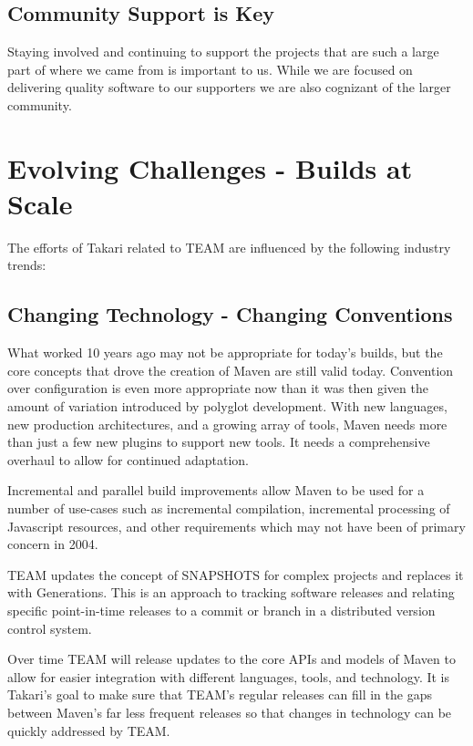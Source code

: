 \documentclass[a4paper]{book}
\begin{document}
\subsection{Community Support is Key}\label{community-support-is-key}

Staying involved and continuing to support the projects that are such a large part of where we came from is important to us. While we are focused on delivering quality software to our supporters we are also cognizant of the larger community.

\section{Evolving Challenges - Builds at Scale}\label{evolving-challenges---builds-at-scale}

The efforts of Takari related to TEAM are influenced by the following industry trends:

\subsection{Changing Technology - Changing Conventions}\label{changing-technology---changing-conventions}

What worked 10 years ago may not be appropriate for today's builds, but the core concepts that drove the creation of Maven are still valid today. Convention over configuration is even more appropriate now than it was then given the amount of variation introduced by polyglot development. With new languages, new production architectures, and a growing array of tools, Maven needs more than just a few new plugins to support new tools. It needs a comprehensive overhaul to allow for continued adaptation.

Incremental and parallel build improvements allow Maven to be used for a number of use-cases such as incremental compilation, incremental processing of Javascript resources, and other requirements which may not have been of primary concern in 2004.

TEAM updates the concept of SNAPSHOTS for complex projects and replaces it with Generations. This is an approach to tracking software releases and relating specific point-in-time releases to a commit or branch in a distributed version control system.

Over time TEAM will release updates to the core APIs and models of Maven to allow for easier integration with different languages, tools, and technology. It is Takari's goal to make sure that TEAM's regular releases can fill in the gaps between Maven's far less frequent releases so that changes in technology can be quickly addressed by TEAM.
\end{document}
